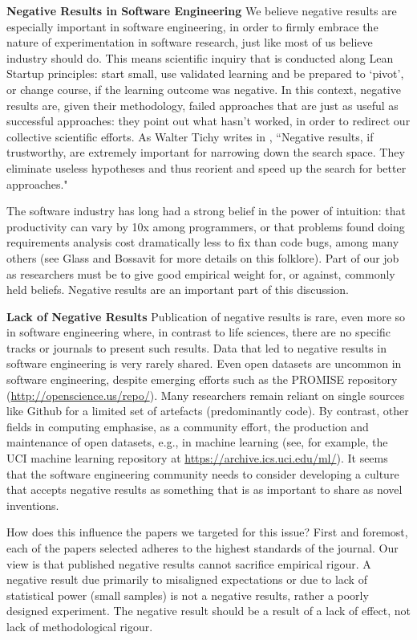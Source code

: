 \documentclass{svjour3}                     %
\begin{document}
\noindent\textbf{Negative Results in Software Engineering}
We believe negative results are especially important in software engineering, in order to firmly embrace the nature of experimentation in software research, just like most of us believe industry should do. This means scientific inquiry that is conducted along Lean Startup \cite{ries} principles: start small, use validated learning and be prepared to `pivot', or change course, if the learning outcome was negative. In this context, negative results are, given their methodology, failed approaches that are just as useful as successful approaches: they point out what hasn't worked, in order to redirect our collective scientific efforts. As Walter Tichy writes in \cite{tichy}, ``Negative results, if trustworthy, are extremely important for narrowing down the search space. They eliminate useless hypotheses and thus reorient and speed up the search for better approaches."

The software industry has long had a strong belief in the power of intuition: that productivity can vary by 10x among programmers, or that problems found doing requirements analysis cost dramatically less to fix than code bugs, among many others (see Glass \cite{glass} and Bossavit \cite{bossavit} for more details on this folklore). Part of our job as researchers must be to give good empirical weight for, or against, commonly held beliefs. Negative results are an important part of this discussion.

\noindent\textbf{Lack of Negative Results }
Publication of negative results is rare, even more so in software engineering where, in contrast to life sciences, there are no specific tracks or journals to present such results. Data that led to negative results in software engineering is very rarely shared. Even open datasets are uncommon in software engineering, despite emerging efforts such as the PROMISE repository (\url{http://openscience.us/repo/}). Many researchers remain reliant on single sources like Github for a limited set of artefacts (predominantly code). By contrast, other fields in computing emphasise, as a community effort, the production and maintenance of open datasets, e.g., in machine learning (see, for example, the UCI machine learning repository at \url{https://archive.ics.uci.edu/ml/}). It seems that the software engineering community needs to consider developing a culture that accepts negative results as something that is as important to share as novel inventions.

How does this influence the papers we targeted for this issue? First and foremost, each of the papers selected adheres to the highest standards of the journal.
Our view is that published negative results cannot sacrifice empirical rigour. A negative result due primarily to misaligned expectations or due to lack of statistical power (small samples) is not a negative results, rather a poorly designed experiment. The negative result should be a result of a lack of effect, not lack of methodological rigour.
\end{document}
